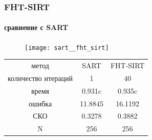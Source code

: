 \begin{frame}
\frametitle{FHT-SIRT}
\framesubtitle{сравнение с SART}
  \begin{figure}
  \texttt{[image: sart\_\_fht\_sirt]}
  \end{figure}

\vspace{0.5cm}


\small
\begin{tabular}{c|c c}
    метод & SART & FHT-SIRT \\ \vspace{5pt}
    количество итераций & 1 & 40 \\ \vspace{5pt}
    время & 0.931c & 0.935c \\ \vspace{5pt}
    ошибка & 11.8845 & 16.1192 \\ \vspace{5pt}
    СКО & 0.3278 & 0.3882 \\ \vspace{5pt}
    N & 256 & 256 \\
\end{tabular}

\end{frame}


